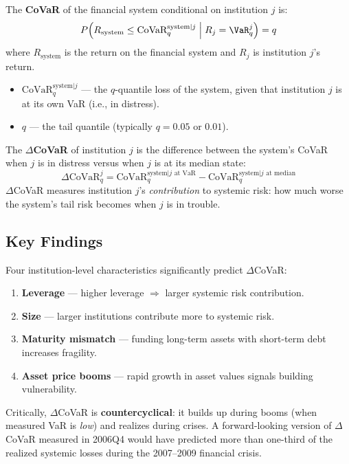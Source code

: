 \begin{definition}
The \textbf{CoVaR} of the financial system conditional on institution $j$ is:
\begin{equation}
P\!\left(R_{\text{system}} \leq \text{CoVaR}_{q}^{\text{system}|j} \;\middle|\; R_j = \VaR_q^j\right) = q
\label{eq:covar-def}
\end{equation}
where $R_{\text{system}}$ is the return on the financial system and $R_j$ is institution $j$'s return.
\begin{itemize}[nosep]
  \item $\text{CoVaR}_{q}^{\text{system}|j}$ --- the $q$-quantile loss of the system, given that institution $j$ is at its own VaR (i.e., in distress).
  \item $q$ --- the tail quantile (typically $q = 0.05$ or $0.01$).
\end{itemize}

The \textbf{$\Delta$CoVaR} of institution $j$ is the difference between the system's CoVaR when $j$ is in distress versus when $j$ is at its median state:
\begin{equation}
\Delta\text{CoVaR}_{q}^{j} = \text{CoVaR}_{q}^{\text{system}|j \text{ at VaR}} - \text{CoVaR}_{q}^{\text{system}|j \text{ at median}}
\label{eq:delta-covar}
\end{equation}
$\Delta$CoVaR measures institution $j$'s \emph{contribution} to systemic risk: how much worse the system's tail risk becomes when $j$ is in trouble.
\end{definition}

\subsection{Key Findings}

\begin{keyresult}
Four institution-level characteristics significantly predict $\Delta$CoVaR:
\begin{enumerate}[nosep]
  \item \textbf{Leverage} --- higher leverage $\Rightarrow$ larger systemic risk contribution.
  \item \textbf{Size} --- larger institutions contribute more to systemic risk.
  \item \textbf{Maturity mismatch} --- funding long-term assets with short-term debt increases fragility.
  \item \textbf{Asset price booms} --- rapid growth in asset values signals building vulnerability.
\end{enumerate}
Critically, $\Delta$CoVaR is \textbf{countercyclical}: it builds up during booms (when measured VaR is \emph{low}) and realizes during crises. A forward-looking version of $\Delta$CoVaR measured in 2006Q4 would have predicted more than one-third of the realized systemic losses during the 2007--2009 financial crisis.
\end{keyresult}


